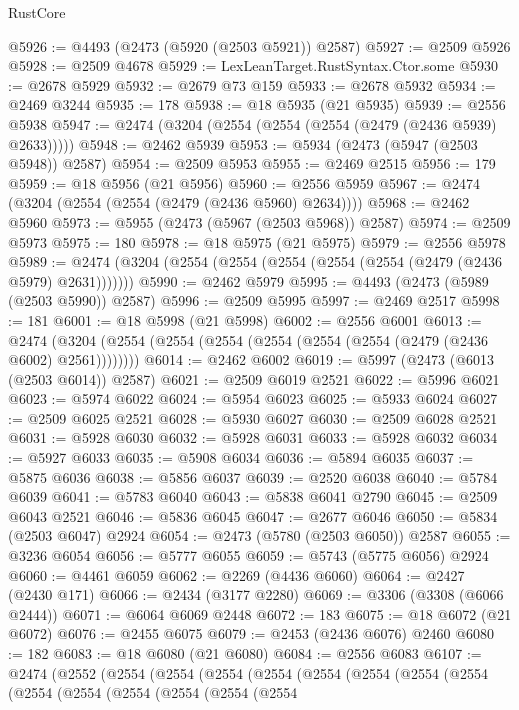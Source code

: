 \begin{lexlean}{RustCore}
\begin{coremodule}
@5926 := @4493 (@2473 (@5920 (@2503 @5921)) @2587)
@5927 := @2509 @5926
@5928 := @2509 @4678
@5929 := LexLeanTarget.RustSyntax.Ctor.some
@5930 := @2678 @5929
@5932 := @2679 @73 @159
@5933 := @2678 @5932
@5934 := @2469 @3244
@5935 := 178
@5938 := @18 @5935 (@21 @5935)
@5939 := @2556 @5938
@5947 := @2474 (@3204 (@2554 (@2554 (@2554 (@2479 (@2436 @5939) @2633)))))
@5948 := @2462 @5939
@5953 := @5934 (@2473 (@5947 (@2503 @5948)) @2587)
@5954 := @2509 @5953
@5955 := @2469 @2515
@5956 := 179
@5959 := @18 @5956 (@21 @5956)
@5960 := @2556 @5959
@5967 := @2474 (@3204 (@2554 (@2554 (@2479 (@2436 @5960) @2634))))
@5968 := @2462 @5960
@5973 := @5955 (@2473 (@5967 (@2503 @5968)) @2587)
@5974 := @2509 @5973
@5975 := 180
@5978 := @18 @5975 (@21 @5975)
@5979 := @2556 @5978
@5989 := @2474 (@3204 (@2554 (@2554 (@2554 (@2554 (@2554 (@2479 (@2436 @5979) @2631)))))))
@5990 := @2462 @5979
@5995 := @4493 (@2473 (@5989 (@2503 @5990)) @2587)
@5996 := @2509 @5995
@5997 := @2469 @2517
@5998 := 181
@6001 := @18 @5998 (@21 @5998)
@6002 := @2556 @6001
@6013 := @2474 (@3204 (@2554 (@2554 (@2554 (@2554 (@2554 (@2554 (@2479 (@2436 @6002) @2561))))))))
@6014 := @2462 @6002
@6019 := @5997 (@2473 (@6013 (@2503 @6014)) @2587)
@6021 := @2509 @6019 @2521
@6022 := @5996 @6021
@6023 := @5974 @6022
@6024 := @5954 @6023
@6025 := @5933 @6024
@6027 := @2509 @6025 @2521
@6028 := @5930 @6027
@6030 := @2509 @6028 @2521
@6031 := @5928 @6030
@6032 := @5928 @6031
@6033 := @5928 @6032
@6034 := @5927 @6033
@6035 := @5908 @6034
@6036 := @5894 @6035
@6037 := @5875 @6036
@6038 := @5856 @6037
@6039 := @2520 @6038
@6040 := @5784 @6039
@6041 := @5783 @6040
@6043 := @5838 @6041 @2790
@6045 := @2509 @6043 @2521
@6046 := @5836 @6045
@6047 := @2677 @6046
@6050 := @5834 (@2503 @6047) @2924
@6054 := @2473 (@5780 (@2503 @6050)) @2587
@6055 := @3236 @6054
@6056 := @5777 @6055
@6059 := @5743 (@5775 @6056) @2924
@6060 := @4461 @6059
@6062 := @2269 (@4436 @6060)
@6064 := @2427 (@2430 @171)
@6066 := @2434 (@3177 @2280)
@6069 := @3306 (@3308 (@6066 @2444))
@6071 := @6064 @6069 @2448
@6072 := 183
@6075 := @18 @6072 (@21 @6072)
@6076 := @2455 @6075
@6079 := @2453 (@2436 @6076) @2460
@6080 := 182
@6083 := @18 @6080 (@21 @6080)
@6084 := @2556 @6083
@6107 := @2474
    (@2552
      (@2554
        (@2554
          (@2554
            (@2554
              (@2554
                (@2554
                  (@2554
                    (@2554
                      (@2554
                        (@2554
                          (@2554
                            (@2554
                              (@2554
                                (@2554

\end{coremodule}
\end{lexlean}
